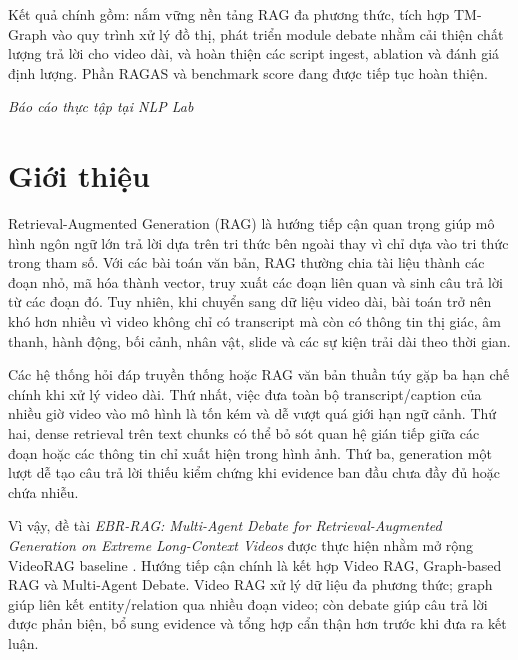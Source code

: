 \documentclass[12pt,a4paper]{article}
\begin{document}
\begin{titlepage}
  \vspace{0.3cm}

  \noindent Kết quả chính gồm: nắm vững nền tảng RAG đa phương thức, tích hợp TM-Graph vào quy trình xử lý đồ thị, phát triển module debate nhằm cải thiện chất lượng trả lời cho video dài, và hoàn thiện các script ingest, ablation và đánh giá định lượng. Phần RAGAS và benchmark score đang được tiếp tục hoàn thiện.

  \vfill

  \begin{center}
    \textit{Báo cáo thực tập tại NLP Lab}
  \end{center}
\end{titlepage}

\section{Giới thiệu}

Retrieval-Augmented Generation (RAG) là hướng tiếp cận quan trọng giúp mô hình ngôn ngữ lớn trả lời dựa trên tri thức bên ngoài thay vì chỉ dựa vào tri thức trong tham số. Với các bài toán văn bản, RAG thường chia tài liệu thành các đoạn nhỏ, mã hóa thành vector, truy xuất các đoạn liên quan và sinh câu trả lời từ các đoạn đó. Tuy nhiên, khi chuyển sang dữ liệu video dài, bài toán trở nên khó hơn nhiều vì video không chỉ có transcript mà còn có thông tin thị giác, âm thanh, hành động, bối cảnh, nhân vật, slide và các sự kiện trải dài theo thời gian.

Các hệ thống hỏi đáp truyền thống hoặc RAG văn bản thuần túy gặp ba hạn chế chính khi xử lý video dài. Thứ nhất, việc đưa toàn bộ transcript/caption của nhiều giờ video vào mô hình là tốn kém và dễ vượt quá giới hạn ngữ cảnh. Thứ hai, dense retrieval trên text chunks có thể bỏ sót quan hệ gián tiếp giữa các đoạn hoặc các thông tin chỉ xuất hiện trong hình ảnh. Thứ ba, generation một lượt dễ tạo câu trả lời thiếu kiểm chứng khi evidence ban đầu chưa đầy đủ hoặc chứa nhiễu.

Vì vậy, đề tài \textit{EBR-RAG: Multi-Agent Debate for Retrieval-Augmented Generation on Extreme Long-Context Videos} được thực hiện nhằm mở rộng VideoRAG baseline \cite{ren2025videorag}. Hướng tiếp cận chính là kết hợp Video RAG, Graph-based RAG và Multi-Agent Debate. Video RAG xử lý dữ liệu đa phương thức; graph giúp liên kết entity/relation qua nhiều đoạn video; còn debate giúp câu trả lời được phản biện, bổ sung evidence và tổng hợp cẩn thận hơn trước khi đưa ra kết luận.
\end{document}
